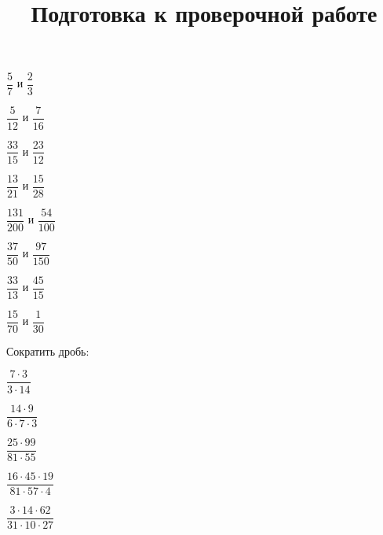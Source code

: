 \begin{listofex}
	\begin{enumcols}[itemcolumns=4]
		\item \( \dfrac{5}{7} \) и \( \dfrac{2}{3} \)
		\item \( \dfrac{5}{12} \) и \( \dfrac{7}{16} \)
		\item \( \dfrac{33}{15} \) и \( \dfrac{23}{12} \)
		\item \( \dfrac{13}{21} \) и \( \dfrac{15}{28} \)
		\item \( \dfrac{131}{200} \) и \( \dfrac{54}{100} \)
		\item \( \dfrac{37}{50} \) и \( \dfrac{97}{150} \)
		\item \( \dfrac{33}{13} \) и \( \dfrac{45}{15} \)
		\item \( \dfrac{15}{70} \) и \( \dfrac{1}{30} \)
	\end{enumcols}
	\item Сократить дробь:
	\begin{enumcols}[itemcolumns=5]
		\item \( \dfrac{7\cdot3}{3\cdot14} \)
		\item \( \dfrac{14\cdot9}{6\cdot7\cdot3} \)
		\item \( \dfrac{25\cdot99}{81\cdot55} \)
		\item \( \dfrac{16\cdot45\cdot19}{81\cdot57\cdot4} \)
		\item \( \dfrac{3\cdot14\cdot62}{31\cdot10\cdot27} \)
	\end{enumcols}
\end{listofex}
\newpage
\title{Подготовка к проверочной работе}
